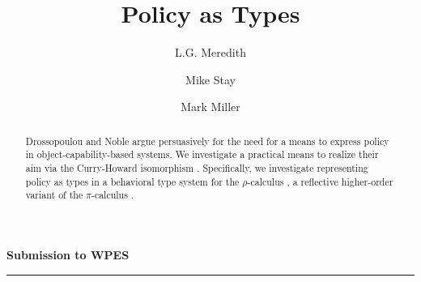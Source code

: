 \documentclass[]{amsart}
\theoremstyle{definition}
\theoremstyle{remark}
\numberwithin{equation}{subsection}
\newcommand{\pic}{$\pi$-calculus}
\newcommand{\rhoc}{$\rho$-calculus}
\newcommand{\papertitle}{Policy as Types}
\begin{document}
\lstset{language=}

\setlength{\topmargin}{0in}
\setlength{\textheight}{8.5in}
\setlength{\parskip}{6pt}

\title{\papertitle}

\author{ L.G. Meredith }
\author{ Mike Stay }
\author{ Mark Miller }







\dedicatory{}



\begin{abstract}
\normalsize{ 

  Drossopoulou and Noble \cite{Drossopoulou:2013:NCP:2489804.2489811}
  argue persuasively for the need for a means to express policy in
  object-capability-based systems. We investigate a practical means to
  realize their aim via the Curry-Howard isomorphism
  \cite{Abramsky:1992:PP:194588.194591}
  \cite{Krivine-TheCurryHowardCorre}. Specifically, we investigate
  representing policy as types in a behavioral type system for the
  \rhoc\; \cite{DBLP:conf/tgc/MeredithR05}, a reflective higher-order
  variant of the \pic\; \cite{milner91polyadicpi}.

}

\end{abstract}

\noindent
{\large \textbf{Submission to WPES}}\\
\rule{6.25in}{0.75pt}\\\\\\

\maketitle
\end{document}
